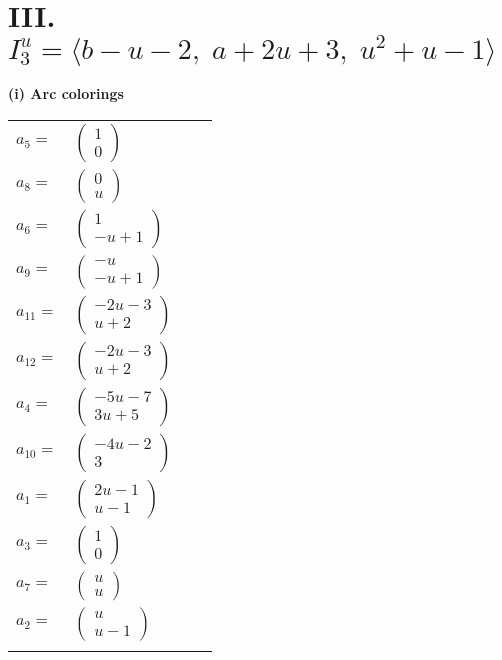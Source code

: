 \documentclass[1p]{elsarticle_modified}
\theoremstyle{definition}
\begin{document}
\centering \section*{III. $I^u_{3}= \langle b- u-2,\;a+2 u+3,\;u^2+u-1 \rangle$}
\flushleft \textbf{(i) Arc colorings}\\
\begin{tabular}{m{7pt} m{180pt} m{7pt} m{180pt} }
\flushright $a_{5}=$&$\begin{pmatrix}1\\0\end{pmatrix}$ \\
\flushright $a_{8}=$&$\begin{pmatrix}0\\u\end{pmatrix}$ \\
\flushright $a_{6}=$&$\begin{pmatrix}1\\- u+1\end{pmatrix}$ \\
\flushright $a_{9}=$&$\begin{pmatrix}- u\\- u+1\end{pmatrix}$ \\
\flushright $a_{11}=$&$\begin{pmatrix}-2 u-3\\u+2\end{pmatrix}$ \\
\flushright $a_{12}=$&$\begin{pmatrix}-2 u-3\\u+2\end{pmatrix}$ \\
\flushright $a_{4}=$&$\begin{pmatrix}-5 u-7\\3 u+5\end{pmatrix}$ \\
\flushright $a_{10}=$&$\begin{pmatrix}-4 u-2\\3\end{pmatrix}$ \\
\flushright $a_{1}=$&$\begin{pmatrix}2 u-1\\u-1\end{pmatrix}$ \\
\flushright $a_{3}=$&$\begin{pmatrix}1\\0\end{pmatrix}$ \\
\flushright $a_{7}=$&$\begin{pmatrix}u\\u\end{pmatrix}$ \\
\flushright $a_{2}=$&$\begin{pmatrix}u\\u-1\end{pmatrix}$\\&\end{tabular}
\end{document}
